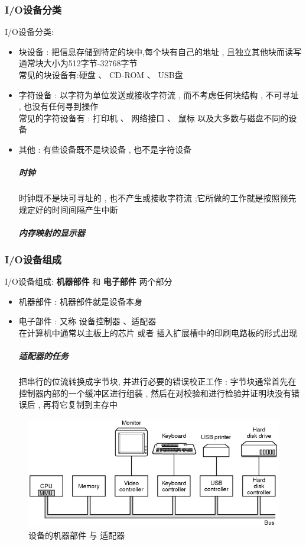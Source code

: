 \documentclass[UTF8,a4paper]{ctexart}
\begin{document}
\subsubsection{I/O设备分类}
I/O设备分类:
\begin{itemize}
	\item 块设备 : 把信息存储到特定的块中,每个块有自己的地址 , 且独立其他块而读写\\
	通常块大小为512字节-32768字节 \\
	常见的块设备有:硬盘 、 CD-ROM 、 USB盘
	\item 字符设备 : 以字符为单位发送或接收字符流 , 而不考虑任何块结构 , 不可寻址 , 也没有任何寻到操作
	\\常见的字符设备有 : 打印机 、 网络接口 、 鼠标 以及大多数与磁盘不同的设备
	\item 其他 : 有些设备既不是块设备 , 也不是字符设备
	\subparagraph{时钟} 时钟既不是块可寻址的 , 也不产生或接收字符流 ;它所做的工作就是按照预先规定好的时间间隔产生中断
	\subparagraph{内存映射的显示器}
\end{itemize}

\subsubsection{I/O设备组成} 
I/O设备组成: \textbf{机器部件} 和 \textbf{电子部件} 两个部分
\begin{itemize}
	\item 机器部件 : 机器部件就是设备本身
	\item 电子部件 : 又称 设备控制器 、适配器 \\
	在计算机中通常以主板上的芯片 或者 插入扩展槽中的印刷电路板的形式出现
	\subparagraph{适配器的任务} 把串行的位流转换成字节块, 并进行必要的错误校正工作 : 字节块通常首先在控制器内部的一个缓冲区进行组装 , 然后在对校验和进行检验并证明块没有错误后 , 再将它复制到主存中
\end{itemize}
\begin{figure}[H]
	\centering
	\includegraphics[scale = 0.3]{assets/ModernOperatingSystems/2018-01-10-15-14-47.png}
	\caption{设备的机器部件 与 适配器}
\end{figure}
\end{document}
